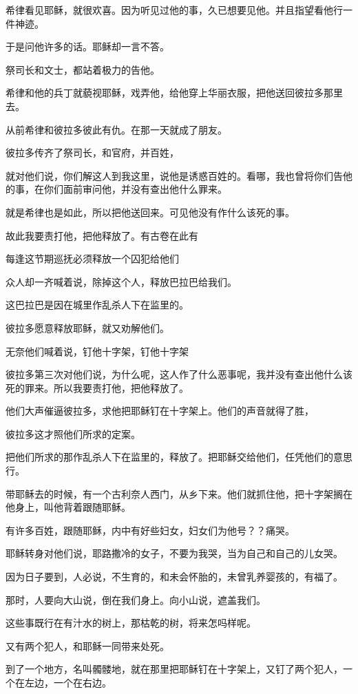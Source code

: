 \documentclass[12pt,oneside]{book}
\begin{document}
希律看见耶稣，就很欢喜。因为听见过他的事，久已想要见他。并且指望看他行一件神迹。

于是问他许多的话。耶稣却一言不答。

祭司长和文士，都站着极力的告他。

希律和他的兵丁就藐视耶稣，戏弄他，给他穿上华丽衣服，把他送回彼拉多那里去。

从前希律和彼拉多彼此有仇。在那一天就成了朋友。

彼拉多传齐了祭司长，和官府，并百姓，

就对他们说，你们解这人到我这里，说他是诱惑百姓的。看哪，我也曾将你们告他的事，在你们面前审问他，并没有查出他什么罪来。

就是希律也是如此，所以把他送回来。可见他没有作什么该死的事。

故此我要责打他，把他释放了。有古卷在此有

每逢这节期巡抚必须释放一个囚犯给他们

众人却一齐喊着说，除掉这个人，释放巴拉巴给我们。

这巴拉巴是因在城里作乱杀人下在监里的。

彼拉多愿意释放耶稣，就又劝解他们。

无奈他们喊着说，钉他十字架，钉他十字架

彼拉多第三次对他们说，为什么呢，这人作了什么恶事呢，我并没有查出他什么该死的罪来。所以我要责打他，把他释放了。

他们大声催逼彼拉多，求他把耶稣钉在十字架上。他们的声音就得了胜，

彼拉多这才照他们所求的定案。

把他们所求的那作乱杀人下在监里的，释放了。把耶稣交给他们，任凭他们的意思行。

带耶稣去的时候，有一个古利奈人西门，从乡下来。他们就抓住他，把十字架搁在他身上，叫他背着跟随耶稣。

有许多百姓，跟随耶稣，内中有好些妇女，妇女们为他号？？痛哭。

耶稣转身对他们说，耶路撒冷的女子，不要为我哭，当为自己和自己的儿女哭。

因为日子要到，人必说，不生育的，和未会怀胎的，未曾乳养婴孩的，有福了。

那时，人要向大山说，倒在我们身上。向小山说，遮盖我们。

这些事既行在有汁水的树上，那枯乾的树，将来怎吗样呢。

又有两个犯人，和耶稣一同带来处死。

到了一个地方，名叫髑髅地，就在那里把耶稣钉在十字架上，又钉了两个犯人，一个在左边，一个在右边。
\end{document}
